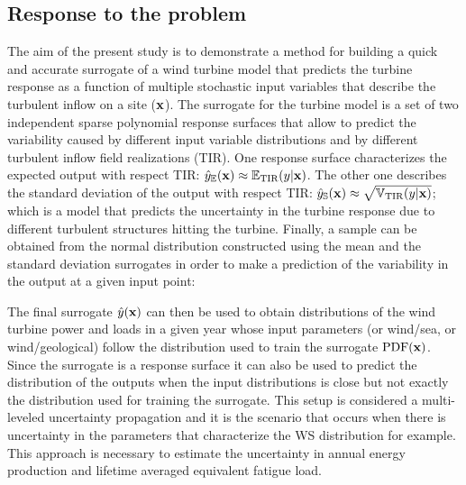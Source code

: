 \documentclass[preprint,12pt]{elsarticle}
\begin{document}
\subsection{Response to the problem}
The aim of the present study is to demonstrate a method for building a quick and accurate surrogate of a wind turbine model that predicts the turbine response as a function of multiple stochastic input variables that describe the turbulent inflow on a site ($\mathbf{x}$). The surrogate for the turbine model is a set of two independent sparse polynomial response surfaces that allow to predict the variability caused by different input variable distributions and by different turbulent inflow field realizations (TIR). %
One response surface characterizes the expected output with respect TIR: $\hat{y}_{\mathbb{E}}(\mathbf{x})\approx \mathbb{E}_{\text{TIR}}(y|\mathbf{x})$. The other one describes the standard deviation of the output with respect TIR: $\hat{y}_{\mathbb{S}}(\mathbf{x}) \approx \sqrt{\mathbb{V}_{\text{TIR}}(y|\mathbf{x})}$; which is a model that predicts the uncertainty in the turbine response due to different turbulent structures hitting the turbine. Finally, a sample can be obtained from the normal distribution constructed using the mean and the standard deviation surrogates in order to make a prediction of the variability in the output at a given input point:



The final surrogate $\hat{y}(\mathbf{x})$ can then be used to obtain distributions of the wind turbine power and loads in a given year whose input parameters (or wind/sea, or wind/geological) follow the distribution used to train the surrogate $\mathrm{PDF}(\mathbf{x})$. Since the surrogate is a response surface it can also be used to predict the distribution of the outputs when the input distributions is close but not exactly the distribution used for training the surrogate. This setup is considered a multi-leveled uncertainty propagation and it is the scenario that occurs when there is uncertainty in the parameters that characterize the WS distribution for example. This approach is necessary to estimate the uncertainty in annual energy production and lifetime averaged equivalent fatigue load.
\end{document}
